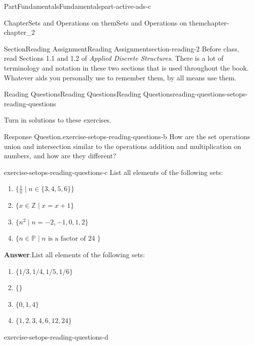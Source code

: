 \documentclass[oneside,10pt,]{book}
\newcommand{\blocktitlefont}{\relax}
\numberwithin{equation}{section}
\begin{document}
\begin{partptx}{Part}{Fundamentals}{}{Fundamentals}{}{}{part-active-ads-c}
\begin{chapterptx}{Chapter}{Sets and Operations on them}{}{Sets and Operations on them}{}{}{chapter-chapter_2}
\begin{sectionptx}{Section}{Reading Assignment}{}{Reading Assignment}{}{}{section-reading-2}
Before class, read Sections 1.1 and 1.2 of \emph{Applied Discrete Structures}. There is a lot of terminology and notation in these two sections that is used throughout the book. Whatever aids you personally use to remember them, by all means use them.%
%
%
\typeout{************************************************}
\typeout{************************************************}
%
\begin{reading-questions-subsection-numberless}{Reading Questions}{Reading Questions}{}{Reading Questions}{}{}{reading-questions-setops-reading-questions}
\begin{introduction}{}%
Turn in solutions to these exercises.%
\end{introduction}%
\begin{divisionexercise}{1}{Response Question.}{}{exercise-setops-reading-questions-b}%
How are the set operations union and intersection similar to the operations addition and multiplication on numbers, and how are they different?%
\end{divisionexercise}%
\begin{divisionexercise}{2}{}{}{exercise-setops-reading-questions-c}%
List all elements of the following sets:%
\begin{enumerate}[label=(\alph*)]
\item{}\(\displaystyle \{\frac{1}{n} \mid n \in \{3,4,5,6\}\}\)%
\item{}\(\displaystyle \{x \in \mathbb{Z} \mid x = x+1 \}\)%
\item{}\(\displaystyle \{n^2 \mid  n = -2, -1, 0, 1, 2\}\)%
\item{}\(\displaystyle \{n \in  \mathbb{P} \mid n \textrm{ is a  factor of  24 }\}\)%
\end{enumerate}
%
\par\smallskip%
\noindent\textbf{\blocktitlefont Answer}.\hypertarget{answer-setops-reading-questions-c-b}{}\quad{}List all elements of the following sets:%
\begin{enumerate}[label=(\alph*)]
\item{}\(\displaystyle \{ 1/3, 1/4, 1/5, 1/6 \}\)%
\item{}\(\displaystyle \{  \}\)%
\item{}\(\displaystyle \{0,1,4\}\)%
\item{}\(\displaystyle \{ 1,2,3,4,6,12,24\}\)%
\end{enumerate}
%
\end{divisionexercise}%
\begin{divisionexercise}{3}{}{}{exercise-setops-reading-questions-d}%

\end{divisionexercise}
\end{reading-questions-subsection-numberless}
\end{sectionptx}
\end{chapterptx}
\end{partptx}
\end{document}
